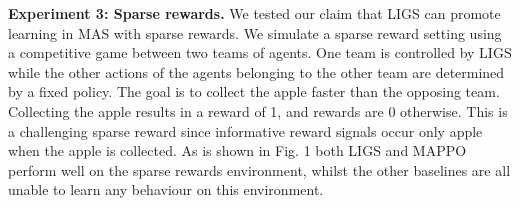 \documentclass{article}
\begin{document}
% 
% 
\textbf{Experiment 3: Sparse rewards. }
We tested our claim that LIGS can promote learning in MAS with sparse rewards. We simulate a sparse reward setting using a competitive game between two teams of agents. One team is controlled by LIGS while the other actions of the agents belonging to the other team are determined by a fixed policy. The goal is to collect the apple faster than the opposing team. Collecting the apple results in a reward of 1, and rewards are 0 otherwise. This is a challenging sparse reward since informative reward signals occur only apple when the apple is collected. As is shown in Fig. 1 both LIGS and MAPPO perform well on the sparse rewards environment, whilst the other baselines are all unable to learn any behaviour on this environment. %
\end{document}
